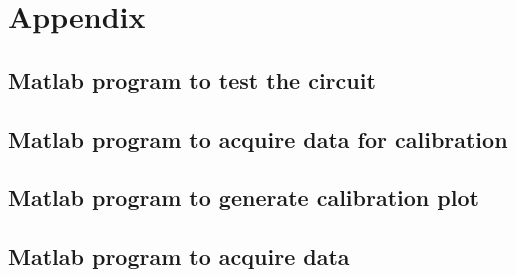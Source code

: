 \documentclass{article} %
\begin{document}
\clearpage
\section{Appendix}
\subsection{Matlab program to test the circuit}
\label{app:testingCode}


\clearpage

\subsection{Matlab program to acquire data for calibration}
\label{app:calibCode}


\clearpage
\subsection{Matlab program to generate calibration plot}
\label{app:genCalib}


\clearpage
\subsection{Matlab program to acquire data}
\label{app:acqCode}

\end{document}
